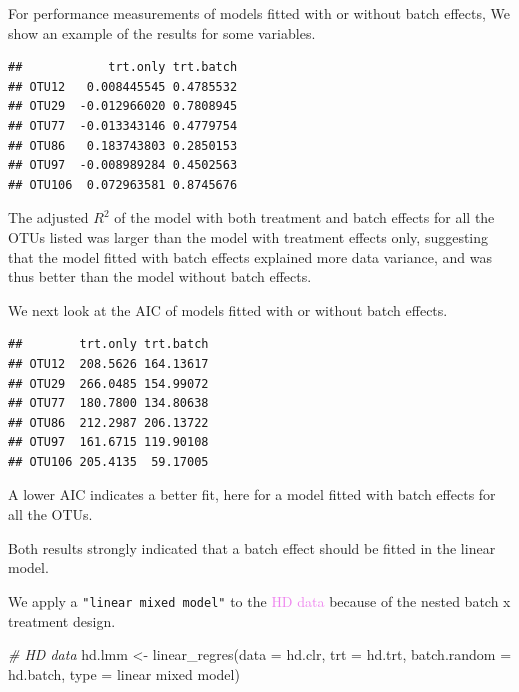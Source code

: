 \documentclass[
]{book}
\newenvironment{Shaded}{\begin{snugshade}}{\end{snugshade}}
\newcommand{\AttributeTok}[1]{\textcolor[rgb]{0.77,0.63,0.00}{#1}}
\newcommand{\CommentTok}[1]{\textcolor[rgb]{0.56,0.35,0.01}{\textit{#1}}}
\newcommand{\FunctionTok}[1]{\textcolor[rgb]{0.00,0.00,0.00}{#1}}
\newcommand{\NormalTok}[1]{#1}
\newcommand{\OtherTok}[1]{\textcolor[rgb]{0.56,0.35,0.01}{#1}}
\newcommand{\SpecialCharTok}[1]{\textcolor[rgb]{0.00,0.00,0.00}{#1}}
\newcommand{\StringTok}[1]{\textcolor[rgb]{0.31,0.60,0.02}{#1}}
\begin{document}
For performance measurements of models fitted with or without batch effects, We show an example of the results for some variables.

\begin{Shaded}
\end{Shaded}

\begin{verbatim}
##            trt.only trt.batch
## OTU12   0.008445545 0.4785532
## OTU29  -0.012966020 0.7808945
## OTU77  -0.013343146 0.4779754
## OTU86   0.183743803 0.2850153
## OTU97  -0.008989284 0.4502563
## OTU106  0.072963581 0.8745676
\end{verbatim}

The adjusted \(R^2\) of the model with both treatment and batch effects for all the OTUs listed was larger than the model with treatment effects only, suggesting that the model fitted with batch effects explained more data variance, and was thus better than the model without batch effects.

We next look at the AIC of models fitted with or without batch effects.

\begin{Shaded}
\end{Shaded}

\begin{verbatim}
##        trt.only trt.batch
## OTU12  208.5626 164.13617
## OTU29  266.0485 154.99072
## OTU77  180.7800 134.80638
## OTU86  212.2987 206.13722
## OTU97  161.6715 119.90108
## OTU106 205.4135  59.17005
\end{verbatim}

A lower AIC indicates a better fit, here for a model fitted with batch effects for all the OTUs.

Both results strongly indicated that a batch effect should be fitted in the linear model.

We apply a \texttt{"linear\ mixed\ model"} to the \textcolor{violet}{HD data} because of the nested batch x treatment design.

\begin{Shaded}
\begin{Highlighting}[]
\CommentTok{\# HD data}
\NormalTok{hd.lmm }\OtherTok{\textless{}{-}} \FunctionTok{linear\_regres}\NormalTok{(}\AttributeTok{data =}\NormalTok{ hd.clr, }\AttributeTok{trt =}\NormalTok{ hd.trt, }
                        \AttributeTok{batch.random =}\NormalTok{ hd.batch, }
                        \AttributeTok{type =} \StringTok{\textquotesingle{}linear mixed model\textquotesingle{}}\NormalTok{)}
\end{Highlighting}
\end{Shaded}
\end{document}
